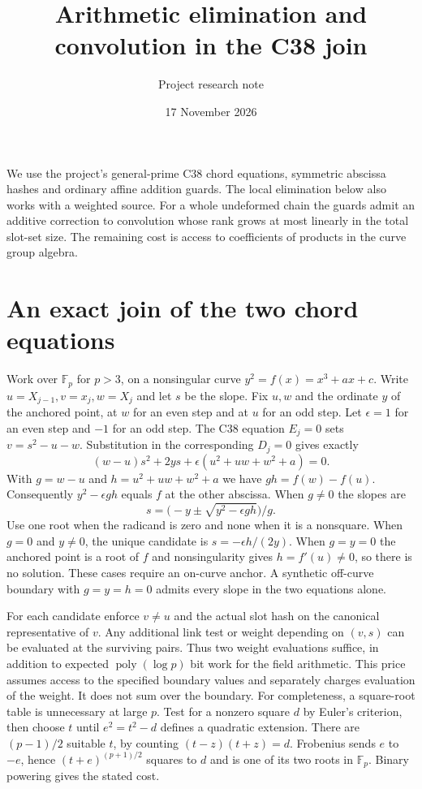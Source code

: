 \documentclass[11pt]{article}
\title{Arithmetic elimination and convolution in the C38 join}
\author{Project research note}
\date{17 November 2026}
\begin{document}
\maketitle

We use the project's general-prime C38 chord equations, symmetric
abscissa hashes and ordinary affine addition guards. The local elimination
below also works with a weighted source. For a whole undeformed chain the
guards admit an additive correction to convolution whose rank grows at
most linearly in the total slot-set size. The remaining cost is access to
coefficients of products in the curve group algebra.

\section{An exact join of the two chord equations}
Work over $\mathbb F_p$ for $p>3$, on a nonsingular curve
$y^2=f(x)=x^3+ax+c$. Write $u=X_{j-1},v=x_j,w=X_j$ and let $s$ be
the slope. Fix $u,w$ and the ordinate $y$ of the anchored point, at $w$
for an even step and at $u$ for an odd step. Let $\epsilon=1$ for an
even step and $-1$ for an odd step. The C38 equation $E_j=0$ sets
$v=s^2-u-w$. Substitution in the corresponding $D_j=0$ gives exactly
\[
  (w-u)s^2+2ys+\epsilon(u^2+uw+w^2+a)=0 .
\]
With $g=w-u$ and $h=u^2+uw+w^2+a$ we have $gh=f(w)-f(u)$.
Consequently $y^2-\epsilon gh$ equals $f$ at the other abscissa.
When $g\ne0$ the slopes are
\[
 s=\big(-y\pm\sqrt{y^2-\epsilon gh}\big)/g .
\]
Use one root when the radicand is zero and none when it is a nonsquare.
When $g=0$ and $y\ne0$, the unique candidate is
$s=-\epsilon h/(2y)$. When $g=y=0$ the anchored point is a root of
$f$ and nonsingularity gives $h=f'(u)\ne0$, so there is no solution.
These cases require an on-curve anchor. A synthetic off-curve boundary
with $g=y=h=0$ admits every slope in the two equations alone.

For each candidate enforce $v\ne u$ and the actual slot hash on the
canonical representative of $v$. Any additional link test or weight
depending on $(v,s)$ can be evaluated at the surviving pairs.
Thus two weight evaluations suffice, in addition to expected
$\operatorname{poly}(\log p)$ bit work for the field arithmetic. This
price assumes access to the specified boundary values and separately
charges evaluation of the weight. It does not sum over the boundary.
For completeness, a square-root table is unnecessary at large $p$.
Test for a nonzero square $d$ by Euler's criterion, then choose $t$
until $e^2=t^2-d$ defines a quadratic extension. There are $(p-1)/2$
suitable $t$, by counting $(t-z)(t+z)=d$. Frobenius sends $e$ to
$-e$, hence $(t+e)^{(p+1)/2}$ squares to $d$ and is one of its two
roots in $\mathbb F_p$. Binary powering gives the stated cost.
\end{document}
